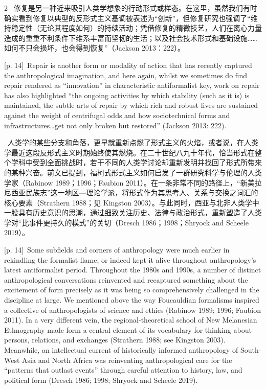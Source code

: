 \documentclass[10pt,a4paper]{article}
\begin{document}
\begin{paracol}{2}
\switchcolumn*
{\scriptsize\color{gray} [p. 14]}\ 修复是另一种近来吸引人类学想象的行动形式或样态。在这里，虽然我们有时确实看到修复以典型的反形式主义基调被表述为“创新”，但修复研究也强调了“维持稳定性（无论其程度如何）的持续活动；凭借修复的精微技艺，人们在离心力量造成的重重不利条件下维系丰富而坚韧的生活；以及社会技术形式和基础设施……如何不只会损坏，也会得到恢复”（Jackson 2013：222）。\par
\switchcolumn
{\scriptsize\color{gray} [p. 14]}\ Repair is another form or modality of action that has recently captured the anthropological imagination, and here again, whilst we sometimes do find repair rendered as “innovation” in characteristic antiformalist key, work on repair has also highlighted “the ongoing activities by which stability (such as it is) is maintained, the subtle arts of repair by which rich and robust lives are sustained against the weight of centrifugal odds and how sociotechnical forms and infrastructures…get not only broken but restored” (Jackson 2013: 222).\par
\switchcolumn*
{\scriptsize\color{gray} [p. 14]}\ 人类学的某些分支和角落，更早就重新点燃了形式主义的火焰，或者说，在人类学最近这段反形式主义时期始终使其燃烧。在二十世纪八九十年代，恰当形式在整个学科中受到全面挑战时，若干不同的人类学讨论却重新发明并找回了形式所带来的某种兴奋。前文已提到，福柯式形式主义如何启发了一群研究科学与伦理的人类学家（Rabinow 1989；1996；Faubion 2011）。在一条非常不同的路径上，“新美拉尼西亚民族志”这一地区—理论学派，将形式作为其思考人、关系与交换之词汇的核心要素（Strathern 1988；见 Kingston 2003）。与此同时，西亚与北非人类学中一股具有历史意识的思潮，通过细致关注历史、法律与政治形式，重新塑造了人类学对“比事件更持久的模式”的关切（Dresch 1986；1998；Shryock and Scheele 2019）。\par
\switchcolumn
{\scriptsize\color{gray} [p. 14]}\ Some subfields and corners of anthropology were much earlier in rekindling the formalist flame, or indeed kept it alive throughout anthropology’s latest antiformalist period. Throughout the 1980s and 1990s, a number of distinct anthropological conversations reinvented and recaptured something about the excitement of form precisely as it was being so comprehensively challenged in the discipline at large. We mentioned above the way Foucauldian formalisms inspired a collective of anthropologists of science and ethics (Rabinow 1989; 1996; Faubion 2011). In a very different vein, the regional-theoretical school of New Melanesian Ethnography made form a central element of its vocabulary for thinking about persons, relations, and exchanges (Strathern 1988; see Kingston 2003). Meanwhile, an intellectual current of historically informed anthropology of South-West Asia and North Africa was reinventing anthropological care for the “patterns that outlast events” through careful attention to history, law, and political form (Dresch 1986; 1998; Shryock and Scheele 2019).\par

\end{paracol}
\end{document}
